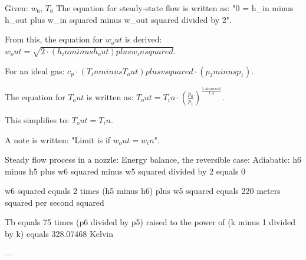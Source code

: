 Given: \( w_6 \), \( T_6 \)  
The equation for steady-state flow is written as:  
"0 = h_in minus h_out plus w_in squared minus w_out squared divided by 2".  

From this, the equation for \( w_out \) is derived:  
\( w_out = \sqrt{2 \cdot (h_in minus h_out) plus w_in squared} \).  

For an ideal gas:  
\( c_p \cdot (T_in minus T_out) plus v squared \cdot (p_3 minus p_1) \).  

The equation for \( T_out \) is written as:  
\( T_out = T_in \cdot \left(\frac{p_0}{p_1}\right)^{\frac{1.4 minus 1}{1.4}} \).  

This simplifies to:  
\( T_out = T_in \).  

A note is written: "Limit is if \( w_out = w_in \)".

Steady flow process in a nozzle:  
Energy balance, the reversible case:  
Adiabatic:  
h6 minus h5 plus w6 squared minus w5 squared divided by 2 equals 0  

w6 squared equals 2 times (h5 minus h6) plus w5 squared  
equals 220 meters squared per second squared  

Tb equals 75 times (p6 divided by p5) raised to the power of (k minus 1 divided by k)  
equals 328.07468 Kelvin  

---